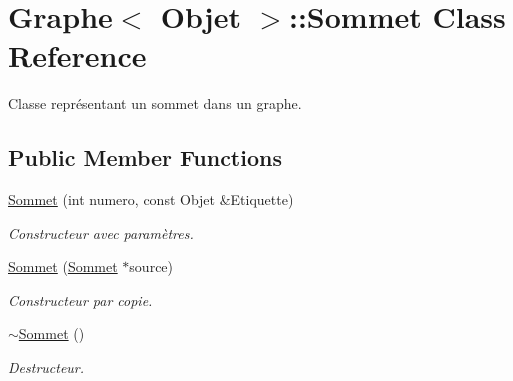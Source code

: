 \hypertarget{class_graphe_1_1_sommet}{
\section{Graphe$<$ Objet $>$::Sommet Class Reference}
\label{class_graphe_1_1_sommet}
}


Classe représentant un sommet dans un graphe.  


\subsection*{Public Member Functions}
\begin{DoxyCompactItemize}
\item 
\hyperlink{class_graphe_1_1_sommet_a25fad13c1d9ca98b4ae6a320760f0f0a}{Sommet} (int numero, const Objet \&Etiquette)
\begin{DoxyCompactList}\small\item\em Constructeur avec paramètres. \end{DoxyCompactList}\item 
\hyperlink{class_graphe_1_1_sommet_adc557f556a6736bac7ea3de0198b093c}{Sommet} (\hyperlink{class_graphe_1_1_sommet}{Sommet} $\ast$source)
\begin{DoxyCompactList}\small\item\em Constructeur par copie. \end{DoxyCompactList}\item 
\hyperlink{class_graphe_1_1_sommet_a20f8a30b1f54aa5ccde192da6baa2668}{$\sim$Sommet} ()
\begin{DoxyCompactList}\small\item\em Destructeur. \end{DoxyCompactList}\end{DoxyCompactItemize}
